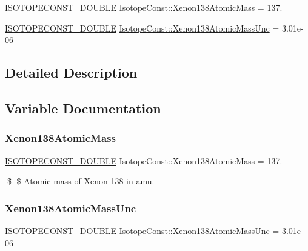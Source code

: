 \begin{DoxyCompactItemize}
\item 
\mbox{\hyperlink{group___isotope_const-_macros_ga8f45a7272ce02c0b4c65c44636ed719a}{I\+S\+O\+T\+O\+P\+E\+C\+O\+N\+S\+T\+\_\+\+D\+O\+U\+B\+LE}} \mbox{\hyperlink{group___isotope_const-_xenon-_xe138_ga08edad0f1f9a673d5a892b110755b0f2}{Isotope\+Const\+::\+Xenon138\+Atomic\+Mass}} = 137.
\item 
\mbox{\hyperlink{group___isotope_const-_macros_ga8f45a7272ce02c0b4c65c44636ed719a}{I\+S\+O\+T\+O\+P\+E\+C\+O\+N\+S\+T\+\_\+\+D\+O\+U\+B\+LE}} \mbox{\hyperlink{group___isotope_const-_xenon-_xe138_gaf2da14e67f4e132c5c3385fe25b598f8}{Isotope\+Const\+::\+Xenon138\+Atomic\+Mass\+Unc}} = 3.\+01e-\/06
\end{DoxyCompactItemize}


\subsection{Detailed Description}


\subsection{Variable Documentation}
\mbox{\label{group___isotope_const-_xenon-_xe138_ga08edad0f1f9a673d5a892b110755b0f2}} 
\subsubsection{\texorpdfstring{Xenon138\+Atomic\+Mass}{Xenon138AtomicMass}}
{\footnotesize\ttfamily \mbox{\hyperlink{group___isotope_const-_macros_ga8f45a7272ce02c0b4c65c44636ed719a}{I\+S\+O\+T\+O\+P\+E\+C\+O\+N\+S\+T\+\_\+\+D\+O\+U\+B\+LE}} Isotope\+Const\+::\+Xenon138\+Atomic\+Mass = 137.}

\$ \$ Atomic mass of Xenon-\/138 in amu. \mbox{\label{group___isotope_const-_xenon-_xe138_gaf2da14e67f4e132c5c3385fe25b598f8}} 
\subsubsection{\texorpdfstring{Xenon138\+Atomic\+Mass\+Unc}{Xenon138AtomicMassUnc}}
{\footnotesize\ttfamily \mbox{\hyperlink{group___isotope_const-_macros_ga8f45a7272ce02c0b4c65c44636ed719a}{I\+S\+O\+T\+O\+P\+E\+C\+O\+N\+S\+T\+\_\+\+D\+O\+U\+B\+LE}} Isotope\+Const\+::\+Xenon138\+Atomic\+Mass\+Unc = 3.\+01e-\/06}

